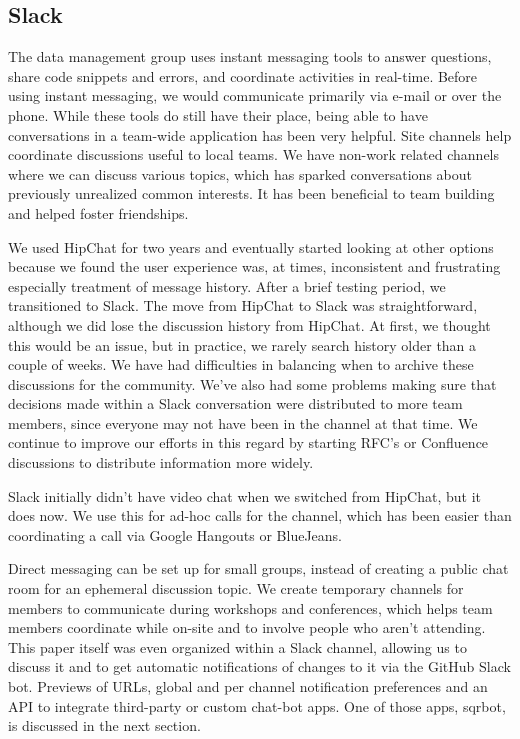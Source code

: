 \subsection{Slack}
\label{sec:slack}

The data management group uses instant messaging tools  to answer questions,
share code snippets and errors, and coordinate activities in real-time.
Before using instant messaging, we would communicate primarily via e-mail or
over the phone. While these tools do still have their place, being able to have
conversations in a team-wide application has been very helpful.
Site channels help coordinate discussions
useful to local teams.  We have non-work related channels where we can
discuss various topics, which has sparked conversations about previously
unrealized common interests. It has been beneficial to team building and
helped foster friendships.


We used HipChat for two years and eventually started looking at other options
because we found the user experience was, at times, inconsistent and
frustrating especially treatment of message history.
After a brief testing period, we transitioned to Slack.
The move from HipChat to Slack was straightforward,
although we did lose the discussion history from HipChat.  At first, we
thought this would be an issue, but in practice, we rarely search history older
than a couple of weeks.  We have had difficulties in balancing when to
archive these discussions for the community.  We've also had some problems
making sure that decisions made within a Slack conversation were
distributed to more team members, since everyone may not have been in the
channel at that time.  We continue to improve our efforts in this regard by
starting RFC's or Confluence discussions to distribute information more widely.

\noindent Slack initially didn't have video chat when we switched from HipChat, but
it does now.  We use this for ad-hoc calls for the channel, which has been
easier than coordinating a call via Google Hangouts or BlueJeans.

Direct messaging can be set up for small groups,
instead of creating a public chat room for an ephemeral discussion topic.
We create temporary channels for members to communicate during workshops and
conferences, which helps team members coordinate while on-site and to involve
people who aren't attending.  This paper itself was even organized
within a Slack channel, allowing us to discuss it and to get automatic
notifications of changes to it via the GitHub Slack bot.
Previews of URLs, global and per channel notification preferences and an
API to integrate third-party or custom chat-bot apps. One of those apps,
sqrbot, is discussed in the next section.


